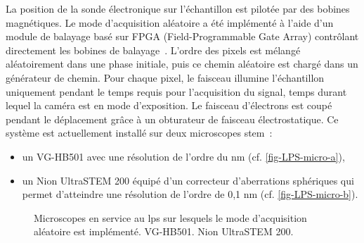     La position de la sonde électronique sur l'échantillon est pilotée par des bobines magnétiques. Le mode d'acquisition aléatoire a été implémenté à l'aide d'un module de balayage basé sur FPGA (Field-Programmable Gate Array) contrôlant directement les bobines de balayage~\cite{zobelli2019spatial}. L'ordre des pixels est mélangé aléatoirement dans une phase initiale, puis ce chemin aléatoire est chargé dans un générateur de chemin. Pour chaque pixel, le faisceau illumine l’échantillon uniquement pendant le temps requis pour l’acquisition du signal, temps durant lequel la caméra est en mode d’exposition. Le faisceau d’électrons est coupé pendant le déplacement grâce à un obturateur de faisceau électrostatique. Ce système est actuellement installé sur deux microscopes \gls{stem} :
    \begin{itemize}
        \item un VG-HB501 avec une résolution de l’ordre du nm (cf. \cref{fig-LPS-micro-a}),
        \item un Nion UltraSTEM 200 équipé d’un correcteur d’aberrations sphériques qui permet d’atteindre une résolution de l’ordre de 0,1 nm (cf. \cref{fig-LPS-micro-b}).
    \end{itemize}

    \begin{figure}
        \centering  %
        \hspace{1em}
        \caption{Microscopes en service au \gls{lps} sur lesquels le mode d'acquisition aléatoire est implémenté.  VG-HB501.  Nion UltraSTEM 200.
            \protect\label{fig-LPS-micro}}
    \end{figure}

